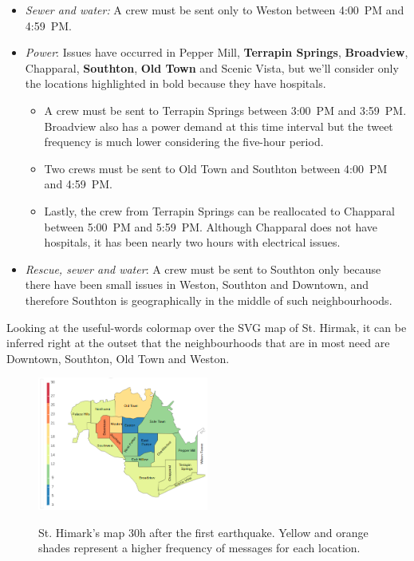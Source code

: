 \begin{itemize}
    \item \emph{Sewer and water:} A crew must be sent only to Weston between 
    4:00~PM and 4:59~PM.
    \smallskip 
    \item \emph{Power}: Issues have occurred in Pepper Mill, \textbf{Terrapin
    Springs}, \textbf{Broadview}, Chapparal, \textbf{Southton}, \textbf{Old 
    Town} and Scenic Vista, but we'll consider only the locations 
    highlighted in bold because they have hospitals.
    \begin{itemize}
        \item A crew must be sent to Terrapin Springs between 3:00~PM and
        3:59~PM. Broadview also has a power demand at this time interval but the
        tweet frequency is much lower considering the five-hour period.
        \item Two crews must be sent to Old Town and Southton between 4:00~PM 
        and 4:59~PM.
        \item Lastly, the crew from Terrapin Springs can be reallocated to
        Chapparal between 5:00~PM and 5:59~PM. Although Chapparal does not have
        hospitals, it has been nearly two hours with electrical issues.
    \end{itemize}
    \item \emph{Rescue, sewer and water}: A crew must be sent to Southton only
    because there have been small issues in Weston, Southton and Downtown, and
    therefore Southton is geographically in the middle of such neighbourhoods.
\end{itemize}

Looking at the useful-words colormap over the SVG map of St. Hirmak, it can be
inferred right at the outset that the neighbourhoods that are in most need are
Downtown, Southton, Old Town and Weston.

\begin{figure}[!h]
    \centering
    \includegraphics[width=0.50\textwidth]{figs/cond_30h/cond_30h_svg.png}
    \label{fig:map_30h}
    \caption{St. Himark's map 30h after the first earthquake. Yellow and orange 
    shades represent a higher frequency of messages for each location.}
\end{figure}

